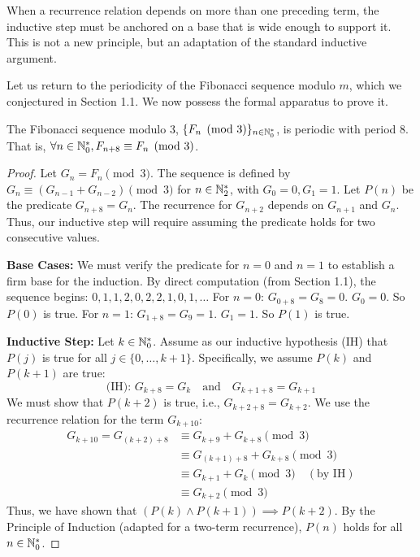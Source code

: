 When a recurrence relation depends on more than one preceding term, the inductive step must be anchored on a base that is wide enough to support it. This is not a new principle, but an adaptation of the standard inductive argument.

Let us return to the periodicity of the Fibonacci sequence modulo $m$, which we conjectured in Section 1.1. We now possess the formal apparatus to prove it.

\begin{theorem}[Pisano Periodicity for $m=3$]\label{thm:pisano_3}
The Fibonacci sequence modulo 3, $\{F_n \pmod 3\}_{n \in \mathbb{N}_{0}^*}$, is periodic with period 8. That is, $\forall n \in \mathbb{N}_{0}^*, F_{n+8} \equiv F_n \pmod 3$.
\end{theorem}
\begin{proof}
Let $G_n = F_n \pmod 3$. The sequence is defined by $G_n \equiv (G_{n-1} + G_{n-2}) \pmod 3$ for $n \in \mathbb{N}_{2}^*$, with $G_0=0, G_1=1$.
Let $P(n)$ be the predicate $G_{n+8} = G_n$. The recurrence for $G_{n+2}$ depends on $G_{n+1}$ and $G_n$. Thus, our inductive step will require assuming the predicate holds for two consecutive values.

\textbf{Base Cases:} We must verify the predicate for $n=0$ and $n=1$ to establish a firm base for the induction.
By direct computation (from Section 1.1), the sequence begins: $0, 1, 1, 2, 0, 2, 2, 1, 0, 1, \dots$
For $n=0$: $G_{0+8} = G_8 = 0$. $G_0 = 0$. So $P(0)$ is true.
For $n=1$: $G_{1+8} = G_9 = 1$. $G_1 = 1$. So $P(1)$ is true.

\textbf{Inductive Step:}
Let $k \in \mathbb{N}_{0}^*$. Assume as our inductive hypothesis (IH) that $P(j)$ is true for all $j \in \{0, \dots, k+1\}$. Specifically, we assume $P(k)$ and $P(k+1)$ are true:
$$ \text{(IH): } G_{k+8} = G_k \quad \text{and} \quad G_{k+1+8} = G_{k+1} $$
We must show that $P(k+2)$ is true, i.e., $G_{k+2+8} = G_{k+2}$.
We use the recurrence relation for the term $G_{k+10}$:
\begin{align*}
    G_{k+10} = G_{(k+2)+8} &\equiv G_{k+9} + G_{k+8} \pmod 3 \\
    &\equiv G_{(k+1)+8} + G_{k+8} \pmod 3 \\
    &\equiv G_{k+1} + G_k \pmod 3 \quad (\text{by IH}) \\
    &\equiv G_{k+2} \pmod 3
\end{align*}
Thus, we have shown that $(P(k) \wedge P(k+1)) \implies P(k+2)$.
By the Principle of Induction (adapted for a two-term recurrence), $P(n)$ holds for all $n \in \mathbb{N}_{0}^*$.
\end{proof}
